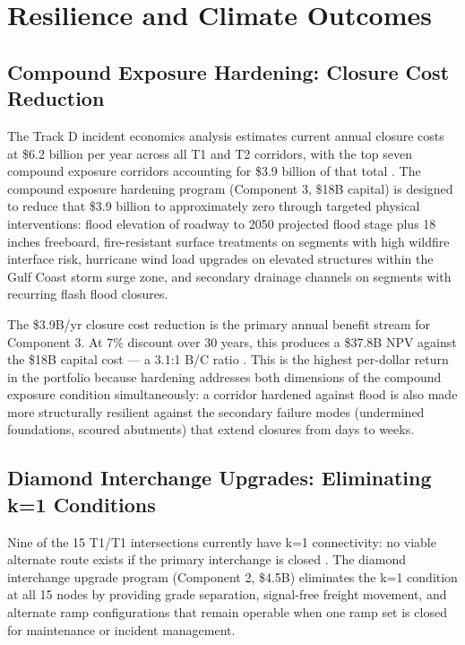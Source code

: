 \section{Resilience and Climate Outcomes}

\subsection{Compound Exposure Hardening: Closure Cost Reduction}

The Track D incident economics analysis estimates current annual closure costs at \$6.2 billion per year across all T1 and T2 corridors, with the top seven compound exposure corridors accounting for \$3.9 billion of that total \citep{ROUTE_D2}. The compound exposure hardening program (Component 3, \$18B capital) is designed to reduce that \$3.9 billion to approximately zero through targeted physical interventions: flood elevation of roadway to 2050 projected flood stage plus 18 inches freeboard, fire-resistant surface treatments on segments with high wildfire interface risk, hurricane wind load upgrades on elevated structures within the Gulf Coast storm surge zone, and secondary drainage channels on segments with recurring flash flood closures.

The \$3.9B/yr closure cost reduction is the primary annual benefit stream for Component 3. At 7\% discount over 30 years, this produces a \$37.8B NPV against the \$18B capital cost --- a 3.1:1 B/C ratio \citep{ROUTE_B3,ROUTE_D2}. This is the highest per-dollar return in the portfolio because hardening addresses both dimensions of the compound exposure condition simultaneously: a corridor hardened against flood is also made more structurally resilient against the secondary failure modes (undermined foundations, scoured abutments) that extend closures from days to weeks.

\subsection{Diamond Interchange Upgrades: Eliminating k=1 Conditions}

Nine of the 15 T1/T1 intersections currently have k=1 connectivity: no viable alternate route exists if the primary interchange is closed \citep{ROUTE_B4}. The diamond interchange upgrade program (Component 2, \$4.5B) eliminates the k=1 condition at all 15 nodes by providing grade separation, signal-free freight movement, and alternate ramp configurations that remain operable when one ramp set is closed for maintenance or incident management.


